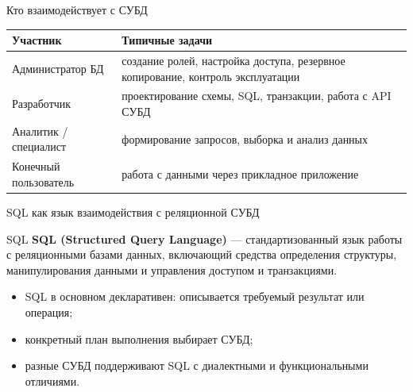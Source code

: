 \documentclass[aspectratio=169]{beamer}
\begin{document}
\begin{frame}{Кто взаимодействует с СУБД}
\small
\begin{table}
\centering
\begin{tabular}{p{}|p{}}
\toprule
\textbf{Участник} & \textbf{Типичные задачи}\\
\midrule
Администратор БД & создание ролей, настройка доступа, резервное копирование, контроль эксплуатации\\
Разработчик & проектирование схемы, SQL, транзакции, работа с API СУБД\\
Аналитик / специалист & формирование запросов, выборка и анализ данных\\
Конечный пользователь & работа с данными через прикладное приложение\\
\bottomrule
\end{tabular}
\end{table}
\end{frame}

\begin{frame}{SQL как язык взаимодействия с реляционной СУБД}
\begin{block}{SQL}
\textbf{SQL (Structured Query Language)} — стандартизованный язык работы
с реляционными базами данных, включающий средства определения структуры,
манипулирования данными и управления доступом и транзакциями.
\end{block}

\vspace{0.3cm}
\begin{itemize}
  \item SQL в основном декларативен: описывается требуемый результат или операция;
  \item конкретный план выполнения выбирает СУБД;
  \item разные СУБД поддерживают SQL с диалектными и функциональными отличиями.
\end{itemize}
\end{frame}
\end{document}
